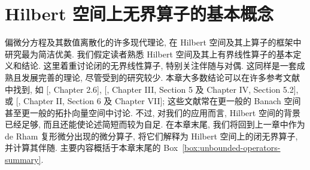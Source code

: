 \clearpage\setcounter{chapter}{2}
\chapter{{Hilbert 空间上无界算子的基本概念}}\label{chap:unbounded-operators}

{偏微分方程及其数值离散化的许多现代理论, 在 Hilbert 空间及其上算子的框架中研究最为简洁优美. 我们假定读者熟悉 Hilbert 空间及其上有界线性算子的基本定义和结论. 这里着重讨论闭的无界线性算子, 特别关注伴随与对偶. 这同样是一套成熟且发展完善的理论, 尽管受到的研究较少. 本章大多数结论可以在许多参考文献中找到, 如 [, Chapter 2.6], [, Chapter III, Section 5 及 Chapter IV, Section 5.2], 或 [, Chapter II, Section 6 及 Chapter VII]; 这些文献常在更一般的 Banach 空间甚至更一般的拓扑向量空间中讨论. 不过, 对我们的应用而言, Hilbert 空间的背景已经足够, 而且还能使论述简短而较为自足. 在本章末尾, 我们将回到上一章中作为 de Rham 复形微分出现的微分算子, 将它们解释为 Hilbert 空间上的闭无界算子, 并计算其伴随. 主要内容概括于本章末尾的 Box~\ref{box:unbounded-operators-summary}.}

